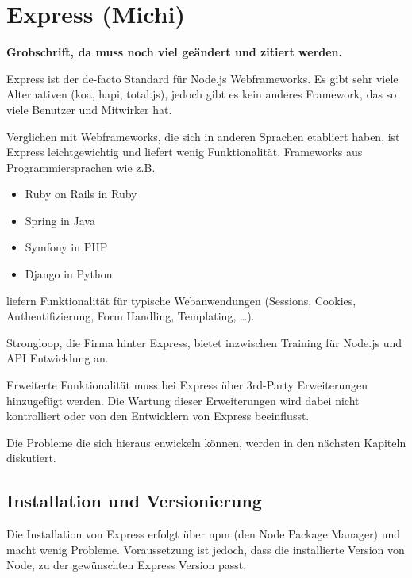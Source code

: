 \chapter{Express (Michi)}\label{express-michi}

\textbf{Grobschrift, da muss noch viel geändert und zitiert werden.}

Express ist der de-facto Standard für Node.js Webframeworks. Es gibt
sehr viele Alternativen (koa\cite{koa}, hapi\cite{hapi}, total.js\cite{totaljs}), jedoch gibt es
kein anderes Framework, das so viele Benutzer und Mitwirker hat.


Verglichen mit Webframeworks, die sich in anderen Sprachen etabliert
haben, ist Express leichtgewichtig und liefert wenig Funktionalität.
Frameworks aus Programmiersprachen wie z.B.

\begin{itemize}
\item
  Ruby on Rails in Ruby
\item
  Spring in Java
\item
  Symfony in PHP
\item
  Django in Python
\end{itemize}

liefern Funktionalität für typische Webanwendungen (Sessions, Cookies,
Authentifizierung, Form Handling, Templating, \ldots{}).

Strongloop\cite{strongloop}, die Firma hinter Express, bietet inzwischen Training für Node.js und API
Entwicklung an.

Erweiterte Funktionalität muss bei Express über 3rd-Party Erweiterungen
hinzugefügt werden. Die Wartung dieser Erweiterungen wird dabei nicht
kontrolliert oder von den Entwicklern von Express beeinflusst.

Die Probleme die sich hieraus enwickeln können, werden in den nächsten Kapiteln diskutiert.

\section{Installation und
Versionierung}\label{installation-und-versionierung}

Die Installation von Express erfolgt über npm (den Node Package Manager)
und macht wenig Probleme. Voraussetzung ist jedoch, dass die
installierte Version von Node, zu der gewünschten Express Version passt.

